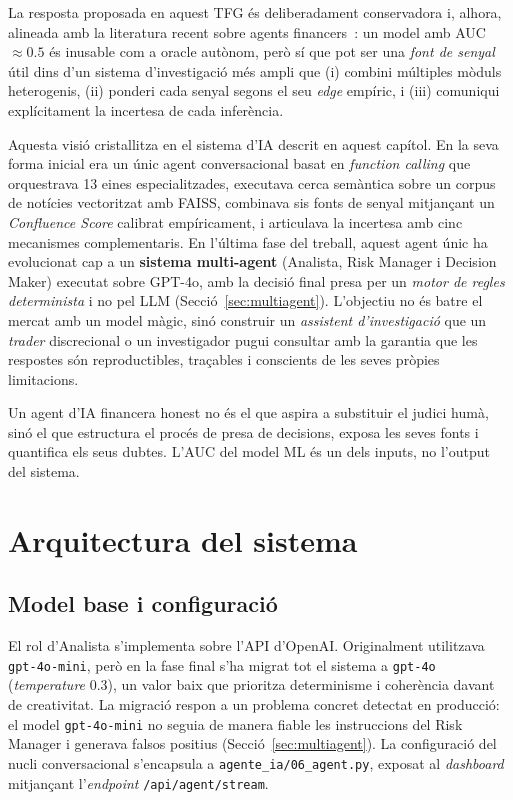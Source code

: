 \documentclass[12pt, a4paper]{report}
\begin{document}
La resposta proposada en aquest TFG és deliberadament conservadora i, alhora, alineada amb la literatura recent sobre agents financers~\cite{stockbench2025}: un model amb AUC $\approx 0.5$ és inusable com a oracle autònom, però sí que pot ser una \emph{font de senyal} útil dins d'un sistema d'investigació més ampli que (i) combini múltiples mòduls heterogenis, (ii) ponderi cada senyal segons el seu \emph{edge} empíric, i (iii) comuniqui explícitament la incertesa de cada inferència.

Aquesta visió cristal\textperiodcentered{}litza en el sistema d'IA descrit en aquest capítol. En la seva forma inicial era un únic agent conversacional basat en \textit{function calling} que orquestrava 13 eines especialitzades, executava cerca semàntica sobre un corpus de notícies vectoritzat amb FAISS, combinava sis fonts de senyal mitjançant un \emph{Confluence Score} calibrat empíricament, i articulava la incertesa amb cinc mecanismes complementaris. En l'última fase del treball, aquest agent únic ha evolucionat cap a un \textbf{sistema multi-agent} (Analista, Risk Manager i Decision Maker) executat sobre GPT-4o, amb la decisió final presa per un \emph{motor de regles determinista} i no pel LLM (Secció~\ref{sec:multiagent}). L'objectiu no és batre el mercat amb un model màgic, sinó construir un \emph{assistent d'investigació} que un \textit{trader} discrecional o un investigador pugui consultar amb la garantia que les respostes són reproductibles, traçables i conscients de les seves pròpies limitacions.

\begin{infobox}
Un agent d'IA financera honest no és el que aspira a substituir el judici humà, sinó el que estructura el procés de presa de decisions, exposa les seves fonts i quantifica els seus dubtes. L'AUC del model ML és un dels inputs, no l'output del sistema.
\end{infobox}

\section{Arquitectura del sistema}

\subsection{Model base i configuració}

El rol d'Analista s'implementa sobre l'API d'OpenAI. Originalment utilitzava \texttt{gpt-4o-mini}, però en la fase final s'ha migrat tot el sistema a \texttt{gpt-4o} (\emph{temperature} 0.3), un valor baix que prioritza determinisme i coherència davant de creativitat. La migració respon a un problema concret detectat en producció: el model \texttt{gpt-4o-mini} no seguia de manera fiable les instruccions del Risk Manager i generava falsos positius (Secció~\ref{sec:multiagent}). La configuració del nucli conversacional s'encapsula a \texttt{agente\_ia/06\_agent.py}, exposat al \textit{dashboard} mitjançant l'\textit{endpoint} \texttt{/api/agent/stream}.
\end{document}
